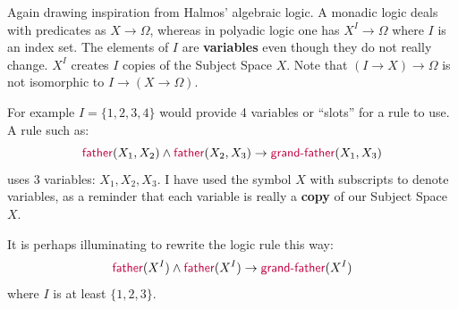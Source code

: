 Again drawing inspiration from Halmos' algebraic logic.  A monadic logic deals with predicates as $X \rightarrow \Omega$, whereas in polyadic logic one has $X^I \rightarrow \Omega$ where $I$ is an index set.  The elements of $I$ are \textbf{variables} even though they do not really change.  $X^I$ creates $I$ copies of the Subject Space $X$. Note that $(I \rightarrow X) \rightarrow \Omega$ is not isomorphic to $I \rightarrow (X \rightarrow \Omega)$.


For example $I = \{ 1,2,3,4 \}$ would provide 4 variables or ``slots'' for a rule to use.  A rule such as:
\begin{equation}
	{\color{purple}\mathsf{father}}(X_1,X_2) \wedge {\color{purple}\mathsf{father}}(X_2,X_3) \rightarrow {\color{purple}\mathsf{grand\hbox{-}father}}(X_1,X_3)
\end{equation}
uses 3 variables: $X_1, X_2, X_3$.  I have used the symbol $X$ with subscripts to denote variables, as a reminder that each variable is really a \textbf{copy} of our Subject Space $X$.


It is perhaps illuminating to rewrite the logic rule this way:
\begin{equation}
	{\color{purple}\mathsf{father}}(X^I) \wedge {\color{purple}\mathsf{father}}(X^I) \rightarrow {\color{purple}\mathsf{grand\hbox{-}father}}(X^I)
\end{equation}
where $I$ is at least $\{ 1,2,3 \}$.

